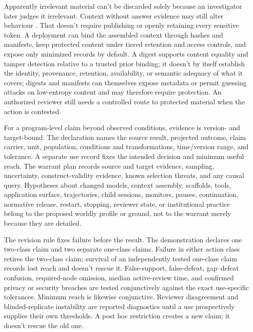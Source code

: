 Apparently irrelevant material can't be discarded solely because an investigator later judges it irrelevant. Context without answer evidence may still alter behaviour \citep{zhang2026illusionRobustness}. That doesn't require publishing or openly retaining every sensitive token. A deployment can bind the assembled context through hashes and manifests, keep protected content under tiered retention and access controls, and expose only minimized records by default. A digest supports content equality and tamper detection relative to a trusted prior binding; it doesn't by itself establish the identity, provenance, retention, availability, or semantic adequacy of what it covers; digests and manifests can themselves expose metadata or permit guessing attacks on low-entropy content and may therefore require protection. An authorized reviewer still needs a controlled route to protected material when the action is contested.

For a program-level claim beyond observed conditions, evidence is version- and target-bound. The declaration names the source result, projected outcome, claim carrier, unit, population, conditions and transformations, time/version range, and tolerance. A separate use record fixes the intended decision and minimum useful reach. The warrant plan records source and target evidence, sampling, uncertainty, construct-validity evidence, known selection threats, and any causal query. Hypotheses about changed models, context assembly, scaffolds, tools, application surface, trajectories, child sessions, monitors, pauses, continuation, normative release, restart, stopping, reviewer state, or institutional practice belong to the proposed worldly profile or ground, not to the warrant merely because they are detailed.

The revision rule fixes failure before the result. The demonstration declares one two-class claim and two separate one-class claims. Failure in either action class retires the two-class claim; survival of an independently tested one-class claim records lost reach and doesn't rescue it. False-support, false-defeat, gap--defeat confusion, required-node omission, median active-review time, and confirmed privacy or security breaches are tested conjunctively against the exact use-specific tolerances. Minimum reach is likewise conjunctive. Reviewer disagreement and blinded-replicate instability are reported diagnostics until a use prospectively supplies their own thresholds. A post hoc restriction creates a new claim; it doesn't rescue the old one.

